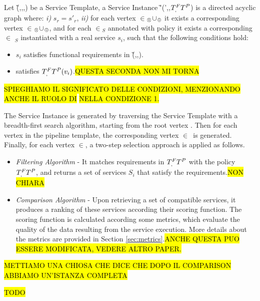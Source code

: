 \begin{definition}\label{def:instance}
  Let \G(\V,\E,\myLambda,\myGamma) be a Service Template, a Service Instance \G'(\V',\E,$T^F_{,}T^{P}$) is a directed acyclic graph where:
  \emph{i)} $s_r$$=$$s'_r$, \emph{ii)} for each vertex \vi{}$\in$\V$_{\otimes}$$\cup$\V$_{\oplus}$ it exists a corresponding vertex \vii{}$\in$\Vp$_{\otimes}$$\cup$\Vp$_{\oplus}$,
      and for each $\in$\V$_S$ annotated with policy  it exists a corresponding $\in$ \Vp$_S$ instantiated with a real service $s_i$, such that the following conditions hold:
  \begin{itemize}
    \item $s_i$ satisfies functional requirements in \G(\Vp,\E,\iChartFunction).
    \item {} satisfies $T^F_{,}T^{P}(v_i)$.\hl{QUESTA SECONDA NON MI TORNA}
  \end{itemize}
\end{definition}

\hl{SPIEGHIAMO IL SIGNIFICATO DELLE CONDIZIONI, MENZIONANDO ANCHE IL RUOLO DI}\F{}\hl{ NELLA CONDIZIONE 1.}

The Service  Instance  is generated by traversing the Service Template with a breadth-first search algorithm, starting from the root vertex . Then for each vertex  in the pipeline template, the corresponding vertex $\in$\Vp\ is generated. Finally, for each vertex $\in$\Vp, a two-step selection approach is applied as follows.
\begin{itemize}
  \item \textit{Filtering Algorithm} - It matches requirements in $T^F_{,}T^{P}$ with the policy $T^F_{,}T^{P}$, and returns a set of services $S_i$ that satisfy the requirements.\hl{NON CHIARA}
  \item \textit{Comparison Algorithm} - Upon retrieving a set of compatible services, it produces a ranking of these services according their scoring function. The scoring function is calculated according some metrics, which evaluate the quality of the data resulting from the service execution. More details about the metrics are provided in Section \ref{sec:metrics}.\hl{ANCHE QUESTA PUO ESSERE MODIFICATA, VEDERE ALTRO PAPER.}
\end{itemize}

\hl{METTIAMO UNA CHIOSA CHE DICE CHE DOPO IL COMPARISON ABBIAMO UN'ISTANZA COMPLETA}

\begin{example}
  \hl{TODO}
\end{example}


